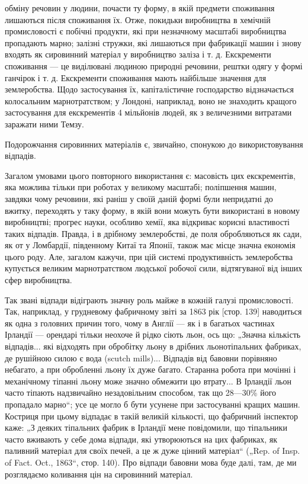 \parcont{}  %
обміну речовин у людини, почасти ту форму, в якій предмети
споживання лишаються після споживання їх. Отже, покидьки
виробництва в хемічній промисловості є побічні продукти, які
при незначному масштабі виробництва пропадають марно; залізні
стружки, які лишаються при фабрикації машин і знову входять
як сировинний матеріал у виробництво заліза і т. д. Екскременти споживання — це виділювані людиною
природні речовини,
рештки одягу у формі ганчірок і т. д. Екскременти споживання
мають найбільше значення для землеробства. Щодо застосування
їх, капіталістичне господарство відзначається колосальним марнотратством; у Лондоні, наприклад, воно
не знаходить кращого
застосування для екскрементів 4  мільйонів людей, як з величезними витратами заражати ними Темзу.

Подорожчання сировинних матеріалів є, звичайно, спонукою
до використовування відпадів.

Загалом умовами цього повторного використання є: масовість
цих екскрементів, яка можлива тільки при роботах у великому
масштабі; поліпшення машин, завдяки чому речовини, які раніш
у своїй даній формі були непридатні до вжитку, переходять
у таку форму, в якій вони можуть бути використані в новому
виробництві; прогрес науки, особливо хемії, яка відкриває корисні властивості таких відпадів.
Правда, і в дрібному землеробстві, де поля обробляються як сади, як от у Ломбардії, південному Китаї
та Японії, також має місце значна економія
цього роду. Але, загалом кажучи, при цій системі продуктивність землеробства купується великим
марнотратством людської робочої сили, відтягуваної від інших сфер виробництва.

Так звані відпади відіграють значну роль майже в кожній
галузі промисловості. Так, наприклад, у грудневому фабричному звіті за 1863 рік [стор. 139]
наводиться як одна з головних
причин того, чому в Англії — як і в багатьох частинах Ірландії —
орендарі тільки неохоче й рідко сіють льон, ось що: „Значна
кількість відпадів... які відходять при обробітку льону в дрібних льонотіпальних фабриках, де
рушійною силою є вода
(scutch mills)... Відпадів від бавовни порівняно небагато, а при
обробленні льону їх дуже багато. Старанна робота при мочінні і механічному тіпанні льону може значно
обмежити цю
втрату... В Ірландії льон часто тіпають надзвичайно незадовільним способом, так що 28—30\% його
пропадало марно“; усе це
могло б бути усунене при застосуванні кращих машин. Костриця при цьому відпадає в такій великій
кількості, що фабричний інспектор каже: „З деяких тіпальних фабрик в Ірландії
мене повідомили, що тіпальники часто вживають у себе дома
відпади, які утворюються на цих фабриках, як паливний матеріал для своїх печей, а це ж дуже цінний
матеріал“ („Rep. of
Insp. of Fact. Oct., 1863“, стор. 140). Про відпади бавовни мова
буде далі, там, де ми розглядаємо коливання цін на сировинний
матеріал.
